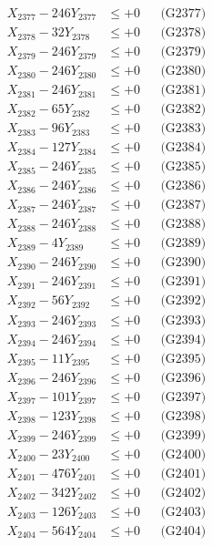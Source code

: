 \documentclass[a4paper,10pt]{article}
\begin{document}
{\begin{align}
X_{2377} - 246Y_{2377} &\leq +0 && \text{(G2377)} \\
X_{2378} - 32Y_{2378} &\leq +0 && \text{(G2378)} \\
X_{2379} - 246Y_{2379} &\leq +0 && \text{(G2379)} \\
X_{2380} - 246Y_{2380} &\leq +0 && \text{(G2380)} \\
\allowbreak
X_{2381} - 246Y_{2381} &\leq +0 && \text{(G2381)} \\
X_{2382} - 65Y_{2382} &\leq +0 && \text{(G2382)} \\
X_{2383} - 96Y_{2383} &\leq +0 && \text{(G2383)} \\
X_{2384} - 127Y_{2384} &\leq +0 && \text{(G2384)} \\
X_{2385} - 246Y_{2385} &\leq +0 && \text{(G2385)} \\
X_{2386} - 246Y_{2386} &\leq +0 && \text{(G2386)} \\
X_{2387} - 246Y_{2387} &\leq +0 && \text{(G2387)} \\
X_{2388} - 246Y_{2388} &\leq +0 && \text{(G2388)} \\
X_{2389} - 4Y_{2389} &\leq +0 && \text{(G2389)} \\
X_{2390} - 246Y_{2390} &\leq +0 && \text{(G2390)} \\
\allowbreak
X_{2391} - 246Y_{2391} &\leq +0 && \text{(G2391)} \\
X_{2392} - 56Y_{2392} &\leq +0 && \text{(G2392)} \\
X_{2393} - 246Y_{2393} &\leq +0 && \text{(G2393)} \\
X_{2394} - 246Y_{2394} &\leq +0 && \text{(G2394)} \\
X_{2395} - 11Y_{2395} &\leq +0 && \text{(G2395)} \\
X_{2396} - 246Y_{2396} &\leq +0 && \text{(G2396)} \\
X_{2397} - 101Y_{2397} &\leq +0 && \text{(G2397)} \\
X_{2398} - 123Y_{2398} &\leq +0 && \text{(G2398)} \\
X_{2399} - 246Y_{2399} &\leq +0 && \text{(G2399)} \\
X_{2400} - 23Y_{2400} &\leq +0 && \text{(G2400)} \\
\allowbreak
X_{2401} - 476Y_{2401} &\leq +0 && \text{(G2401)} \\
X_{2402} - 342Y_{2402} &\leq +0 && \text{(G2402)} \\
X_{2403} - 126Y_{2403} &\leq +0 && \text{(G2403)} \\
X_{2404} - 564Y_{2404} &\leq +0 && \text{(G2404)} \\

\end{align}}
\end{document}
